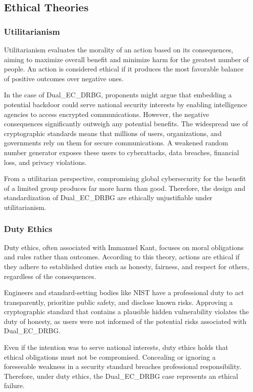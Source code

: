 \documentclass[12pt,letterpaper]{article}
\begin{document}
\subsection{Ethical Theories}

\subsubsection{Utilitarianism}
Utilitarianism evaluates the morality of an action based on its consequences, aiming to maximize overall benefit and minimize harm for the greatest number of people. An action is considered ethical if it produces the most favorable balance of positive outcomes over negative ones.

In the case of Dual\_EC\_DRBG, proponents might argue that embedding a potential backdoor could serve national security interests by enabling intelligence agencies to access encrypted communications. However, the negative consequences significantly outweigh any potential benefits. The widespread use of cryptographic standards means that millions of users, organizations, and governments rely on them for secure communications. A weakened random number generator exposes these users to cyberattacks, data breaches, financial loss, and privacy violations.

From a utilitarian perspective, compromising global cybersecurity for the benefit of a limited group produces far more harm than good. Therefore, the design and standardization of Dual\_EC\_DRBG are ethically unjustifiable under utilitarianism.

\subsubsection{Duty Ethics}
Duty ethics, often associated with Immanuel Kant, focuses on moral obligations and rules rather than outcomes. According to this theory, actions are ethical if they adhere to established duties such as honesty, fairness, and respect for others, regardless of the consequences.

Engineers and standard-setting bodies like NIST have a professional duty to act transparently, prioritize public safety, and disclose known risks. Approving a cryptographic standard that contains a plausible hidden vulnerability violates the duty of honesty, as users were not informed of the potential risks associated with Dual\_EC\_DRBG.

Even if the intention was to serve national interests, duty ethics holds that ethical obligations must not be compromised. Concealing or ignoring a foreseeable weakness in a security standard breaches professional responsibility. Therefore, under duty ethics, the Dual\_EC\_DRBG case represents an ethical failure.
\end{document}
